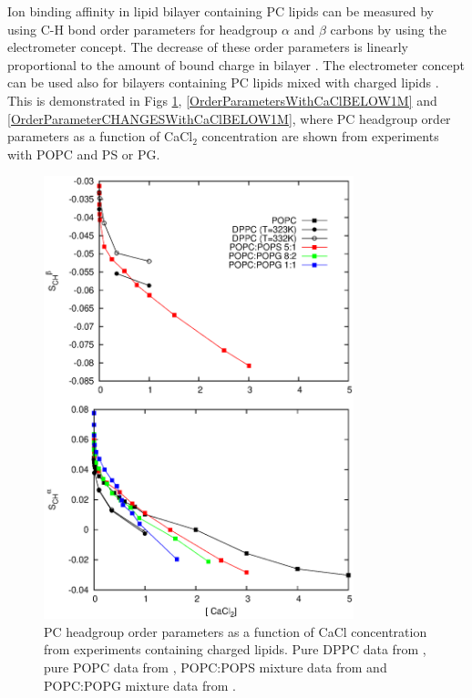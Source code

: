 \documentclass[aps,prl,superscriptaddress,twocolumn]{revtex4}
\begin{document}
Ion binding affinity in lipid bilayer containing PC lipids can be 
measured by using C-H bond order parameters for headgroup $\alpha$ and
$\beta$ carbons by using the electrometer concept. The decrease of these 
order parameters is linearly proportional to the amount of bound charge 
in bilayer \cite{??,catte16}. The electrometer concept can be used also
for bilayers containing PC lipids mixed with charged lipids \cite{macdonal87,roux90,??}.
This is demonstrated in Figs \ref{OrderParametersWithCaCl},
\ref{OrderParametersWithCaClBELOW1M} and \ref{OrderParameterCHANGESWithCaClBELOW1M}, where PC headgroup order parameters 
as a function of CaCl$_2$ concentration are shown from experiments with POPC and PS or PG.
\begin{figure}[]
  \centering
  \includegraphics[width=9.0cm]{../Figs/LIPIDSwithCaCl.eps}
  \caption{\label{OrderParametersWithCaCl}
    PC headgroup order parameters as a function of CaCl concentration from experiments containing charged lipids.
    Pure DPPC data from \cite{akutsu81}, pure POPC data from \cite{altenbach84}, 
    POPC:POPS mixture data from \cite{roux90} and POPC:POPG mixture data from \cite{macdonald87}.
  }
\end{figure}
\end{document}
